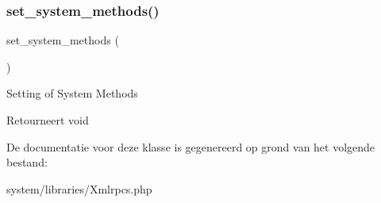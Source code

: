 \subsubsection{\texorpdfstring{set\_system\_methods()}{set\_system\_methods()}}
{\footnotesize\ttfamily set\+\_\+system\+\_\+methods (\begin{DoxyParamCaption}{ }\end{DoxyParamCaption})}

Setting of System Methods

\begin{DoxyReturn}{Retourneert}
void 
\end{DoxyReturn}


De documentatie voor deze klasse is gegenereerd op grond van het volgende bestand\+:\begin{DoxyCompactItemize}
\item 
system/libraries/Xmlrpcs.\+php\end{DoxyCompactItemize}

